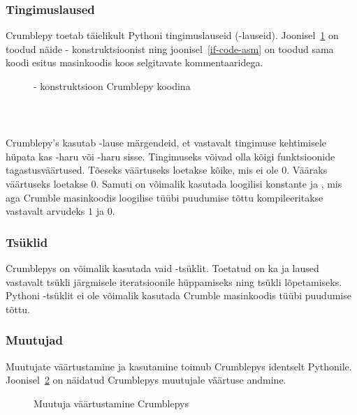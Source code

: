 \documentclass[12pt]{article}
\begin{document}
\subsubsection{Tingimuslaused}
Crumblepy toetab täielikult Pythoni tingimuslauseid (-lauseid). Joonisel~\ref{if-code} on toodud näide - konstruktsioonist ning joonisel~\ref{if-code-asm} on toodud sama koodi esitus masinkoodis koos selgitavate kommentaaridega.

\begin{figure}[!ht]
	\caption{- konstruktsioon Crumblepy koodina}
	\label{if-code}
\end{figure}


\inputminted{text}{if-code-asm.crpy}
~

Crumblepy's kasutab -lause märgendeid, et vastavalt tingimuse kehtimisele hüpata kas -haru või -haru sisse. Tingimuseks võivad olla kõigi funktsioonide tagastusväärtused. Tõeseks väärtuseks loetakse kõike, mis ei ole $0$. Vääraks väärtuseks loetakse $0$. Samuti on võimalik kasutada loogilisi konstante  ja , mis aga Crumble masinkoodis loogilise tüübi puudumise tõttu kompileeritakse vastavalt arvudeks $1$ ja $0$.

\subsubsection{Tsüklid}
Crumblepys on võimalik kasutada vaid -tsüklit. Toetatud on ka  ja  laused vastavalt tsükli järgmisele iteratsioonile hüppamiseks ning tsükli lõpetamiseks. Pythoni -tsüklit ei ole võimalik kasutada Crumble masinkoodis  tüübi puudumise tõttu.

\subsubsection{Muutujad}
Muutujate väärtustamine ja kasutamine toimub Crumblepys identselt Pythonile. Joonisel~\ref{var-example} on näidatud Crumblepys muutujale väärtuse andmine.

\begin{figure}[!ht]
	\caption{Muutuja väärtustamine Crumblepys}
	\label{var-example}
\end{figure}
\end{document}
